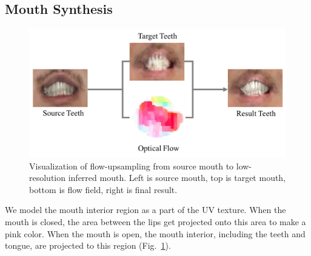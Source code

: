
\subsection{Mouth Synthesis}

\begin{figure}[h]
	\centering
	\includegraphics[width=1\linewidth]{figures/flow/opticalflow2.png}
	\caption{Visualization of flow-upsampling from source mouth to low-resolution inferred mouth.  Left is source mouth, top is target mouth, bottom is flow field, right is final result.}\label{fig:flow}
	\vspace{-0.05in}
\end{figure}
We model the mouth interior region as a part of the UV texture.  When the mouth is closed, the area between the lips get projected onto this area to
make a pink color.  When the mouth is open, the mouth interior, including the teeth and tongue, are projected to this region (Fig.~\ref{fig:flow}).  

